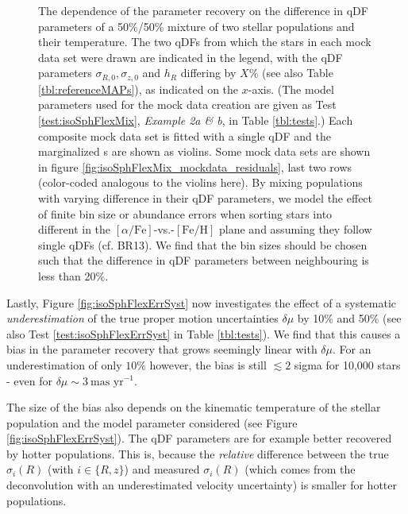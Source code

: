\begin{figure}[!htbp]
\caption{The dependence of the parameter recovery on the difference in qDF parameters of a 50\%/50\% mixture of two stellar populations and their temperature. The two qDFs from which the stars in each mock data set were drawn are indicated in the legend, with the qDF parameters $\sigma_{R,0}, \sigma_{z,0}$ and $h_R$ differing by $X\%$ (see also Table \ref{tbl:referenceMAPs}), as indicated on the $x$-axis. (The model parameters used for the mock data creation are given as Test \ref{test:isoSphFlexMix}, \emph{Example 2a \& b}, in Table \ref{tbl:tests}.) Each composite mock data set is fitted with a single qDF and the marginalized \pdf{}s are shown as violins. Some mock data sets are shown in figure \ref{fig:isoSphFlexMix_mockdata_residuals}, last two rows (color-coded analogous to the violins here). By mixing populations with varying difference in their qDF parameters, we model the effect of finite bin size or abundance errors when sorting stars into different \MAPs{} in the $[\alpha/\mathrm{Fe}]$-vs.-$[\mathrm{Fe}/\mathrm{H}]$ plane and assuming they follow single qDFs (cf. BR13). We find that the bin sizes should be chosen such that the difference in qDF parameters between neighbouring \MAPs{} is less than 20\%.  } 
\label{fig:isoSphFlexMixDiff}
\end{figure}


Lastly, Figure \ref{fig:isoSphFlexErrSyst} now investigates the effect of a systematic \emph{underestimation} of the true proper motion uncertainties $\delta \mu$ by 10\% and 50\% (see also Test \ref{test:isoSphFlexErrSyst} in Table \ref{tbl:tests}). We find that this causes a bias in the parameter recovery that grows seemingly linear with $\delta \mu$. For an underestimation of only $10\%$ however, the bias is still $\lesssim 2$ sigma for 10,000 stars \Wilma{[TO DO: Check]} - even for $\delta \mu \sim 3~\text{mas yr}^{-1}$.

The size of the bias also depends on the kinematic temperature of the stellar population and the model parameter considered (see Figure \ref{fig:isoSphFlexErrSyst}). The qDF parameters are for example better recovered by hotter populations. This is, because the \emph{relative} difference between the true $\sigma_i(R)$ (with $i \in \{R,z\}$) and measured $\sigma_i(R)$ (which comes from the deconvolution with an underestimated velocity uncertainty) is smaller for hotter populations. 
